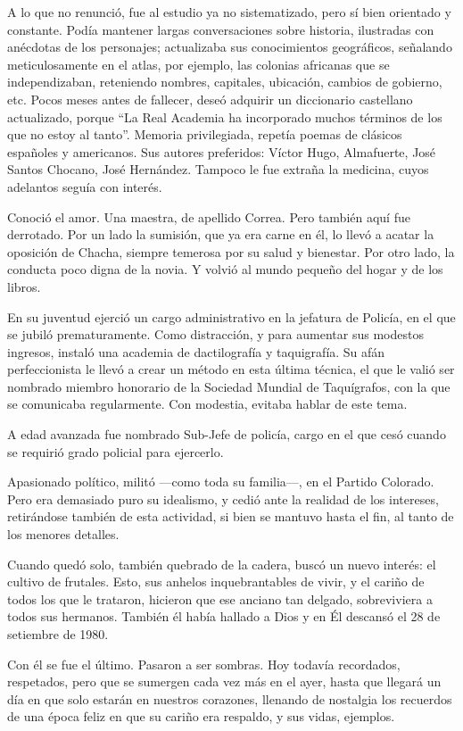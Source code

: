 \documentclass[a4paper]{article}
\begin{document}
A lo que no renunció, fue al estudio ya no sistematizado, pero sí bien orientado y constante. Podía mantener largas conversaciones sobre historia, ilustradas con anécdotas de los personajes; actualizaba sus conocimientos geográficos, señalando meticulosamente en el atlas, por ejemplo, las colonias africanas que se independizaban, reteniendo nombres, capitales, ubicación, cambios de gobierno, etc. Pocos meses antes de fallecer, deseó adquirir un diccionario castellano actualizado, porque ``La Real Academia ha incorporado muchos términos de los que no estoy al tanto''. Memoria privilegiada, repetía poemas de clásicos españoles y americanos. Sus autores preferidos: Víctor Hugo, Almafuerte, José Santos Chocano, José Hernández. Tampoco le fue extraña la medicina, cuyos adelantos seguía con interés.

Conoció el amor. Una maestra, de apellido Correa. Pero también aquí fue derrotado. Por un lado la sumisión, que ya era carne en él, lo llevó a acatar la oposición de Chacha, siempre temerosa por su salud y bienestar. Por otro lado, la conducta poco digna de la novia. Y volvió al mundo pequeño del hogar y de los libros.

En su juventud ejerció un cargo administrativo en la jefatura de Policía, en el que se jubiló prematuramente. Como distracción, y para aumentar sus modestos ingresos, instaló una academia de dactilografía y taquigrafía. Su afán perfeccionista le llevó a crear un método en esta última técnica, el que le valió ser nombrado miembro honorario de la Sociedad Mundial de Taquígrafos, con la que se comunicaba regularmente. Con modestia, evitaba hablar de este tema.

A edad avanzada fue nombrado Sub-Jefe de policía, cargo en el que cesó cuando se requirió grado policial para ejercerlo.

Apasionado político, militó ---como toda su familia---, en el Partido Colorado. Pero era demasiado puro su idealismo, y cedió ante la realidad de los intereses, retirándose también de esta actividad, si bien se mantuvo hasta el fin, al tanto de los menores detalles.

Cuando quedó solo, también quebrado de la cadera, buscó un nuevo interés: el cultivo de frutales. Esto, sus anhelos inquebrantables de vivir, y el cariño de todos los que le trataron, hicieron que ese anciano tan delgado, sobreviviera a todos sus hermanos. También él había hallado a Dios y en Él descansó el 28 de setiembre de 1980.

Con él se fue el último. Pasaron a ser sombras. Hoy todavía recordados, respetados, pero que se sumergen cada vez más en el ayer, hasta que llegará un día en que solo estarán en nuestros corazones, llenando de nostalgia los recuerdos de una época feliz en que su cariño era respaldo, y sus vidas, ejemplos.
\end{document}
